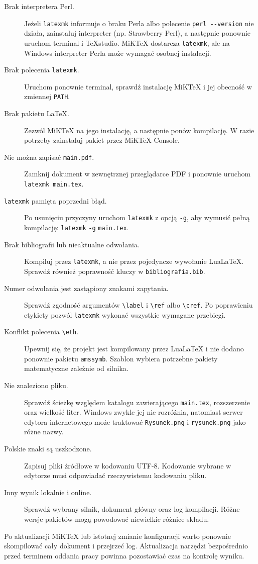 \begin{description}
  \item[Brak interpretera Perl.] Jeżeli \texttt{latexmk} informuje o braku Perla albo polecenie \texttt{perl -{}-version} nie działa, zainstaluj interpreter (np. Strawberry Perl), a następnie ponownie uruchom terminal i TeXstudio. MiKTeX dostarcza \texttt{latexmk}, ale na Windows interpreter Perla może wymagać osobnej instalacji.
  \item[Brak polecenia \texttt{latexmk}.] Uruchom ponownie terminal, sprawdź instalację MiKTeX i jej obecność w zmiennej \texttt{PATH}.
  \item[Brak pakietu LaTeX.] Zezwól MiKTeX na jego instalację, a następnie ponów kompilację. W razie potrzeby zainstaluj pakiet przez MiKTeX Console.
  \item[Nie można zapisać \texttt{main.pdf}.] Zamknij dokument w zewnętrznej przeglądarce PDF i ponownie uruchom \texttt{latexmk main.tex}.
  \item[\texttt{latexmk} pamięta poprzedni błąd.] Po usunięciu przyczyny uruchom \texttt{latexmk} z opcją \texttt{-g}, aby wymusić pełną kompilację: \texttt{latexmk} \texttt{-g} \texttt{main.tex}.
  \item[Brak bibliografii lub nieaktualne odwołania.] Kompiluj przez \texttt{latexmk}, a nie przez pojedyncze wywołanie LuaLaTeX. Sprawdź również poprawność kluczy w \texttt{bibliografia.bib}.
  \item[Numer odwołania jest zastąpiony znakami zapytania.] Sprawdź zgodność argumentów \verb|\label| i \verb|\ref| albo \verb|\cref|. Po poprawieniu etykiety pozwól \texttt{latexmk} wykonać wszystkie wymagane przebiegi.
  \item[Konflikt polecenia \texttt{\textbackslash eth}.] Upewnij się, że projekt jest kompilowany przez LuaLaTeX i nie dodano ponownie pakietu \texttt{amssymb}. Szablon wybiera potrzebne pakiety matematyczne zależnie od silnika.
  \item[Nie znaleziono pliku.] Sprawdź ścieżkę względem katalogu zawierającego \texttt{main.tex}, rozszerzenie oraz wielkość liter. Windows zwykle jej nie rozróżnia, natomiast serwer edytora internetowego może traktować \texttt{Rysunek.png} i \texttt{rysunek.png} jako różne nazwy.
  \item[Polskie znaki są uszkodzone.] Zapisuj pliki źródłowe w kodowaniu UTF-8. Kodowanie wybrane w edytorze musi odpowiadać rzeczywistemu kodowaniu pliku.
  \item[Inny wynik lokalnie i online.] Sprawdź wybrany silnik, dokument główny oraz log kompilacji. Różne wersje pakietów mogą powodować niewielkie różnice składu.
\end{description}

Po aktualizacji MiKTeX lub istotnej zmianie konfiguracji warto ponownie skompilować cały dokument i przejrzeć log. Aktualizacja narzędzi bezpośrednio przed terminem oddania pracy powinna pozostawiać czas na kontrolę wyniku.
